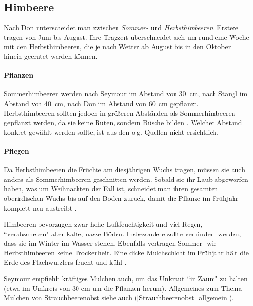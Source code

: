 \subsection{Himbeere}
\label{Himbeere}

Nach Don \cite[S.~420]{Don2021} unterscheidet man zwischen \textit{Sommer-} und \textit{Herbsthimbeeren}.
Erstere tragen von Juni bis August.
Ihre Tragzeit überschneidet sich um rund eine Woche mit den Herbsthimbeeren, die je nach Wetter ab August bis in den Oktober hinein geerntet werden können.

\paragraph{Pflanzen}

Sommerhimbeeren werden nach Seymour \cite[S.~175]{Seymour1978} im Abstand von 30~cm, nach Stangl \cite[S.~XY]{Stangl1995} im Abstand von 40~cm, nach Don \cite[S.~420]{Don2021} im Abstand von 60~cm gepflanzt.
Herbsthimbeeren sollten jedoch in größeren Abständen als Sommerhimbeeren gepflanzt werden, da sie keine Ruten, sondern Büsche bilden \cite[S.~420]{Don2021}.
Welcher Abstand konkret gewählt werden sollte, ist aus den o.g. Quellen nicht ersichtlich.

\paragraph{Pflegen}

Da Herbsthimbeeren die Früchte am diesjährigen Wuchs tragen, müssen sie auch anders als Sommerhimbeeren geschnitten werden.
Sobald sie ihr Laub abgeworfen haben, was um Weihnachten der Fall ist, schneidet man ihren gesamten oberirdischen Wuchs bis auf den Boden zurück, damit die Pflanze im Frühjahr komplett neu austreibt \cite[S.~421]{Don2021}.

Himbeeren bevorzugen zwar hohe Luftfeuchtigkeit und viel Regen, ``verabscheuen" aber kalte, nasse Böden.
Insbesondere sollte verhindert werden, dass sie im Winter im Wasser stehen.
Ebenfalls vertragen Sommer- wie Herbsthimbeeren keine Trockenheit.
Eine dicke Mulchschicht im Frühjahr hält die Erde des Flachwurzlers feucht und kühl \cite[S.~421]{Don2021}.

Seymour \cite[S.~176]{Seymour1978} empfiehlt kräftiges Mulchen auch, um das Unkraut ``in Zaum" zu halten (etwa im Umkreis von 30 cm um die Pflanzen herum).
Allgemeines zum Thema Mulchen von Strauchbeerenobst siehe auch (\ref{Strauchbeerenobst_allgemein}).

